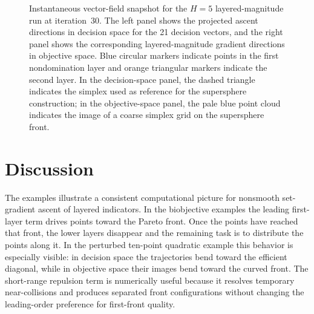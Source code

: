 \documentclass{article}
\begin{document}
\begin{figure}[htbp]




















































\caption{Instantaneous vector-field snapshot for the $H=5$ layered-magnitude run at iteration~30. The left panel shows the projected ascent directions in decision space for the 21 decision vectors, and the right panel shows the corresponding layered-magnitude gradient directions in objective space. Blue circular markers indicate points in the first nondomination layer and orange triangular markers indicate the second layer. In the decision-space panel, the dashed triangle indicates the simplex used as reference for the supersphere construction; in the objective-space panel, the pale blue point cloud indicates the image of a coarse simplex grid on the supersphere front.}
\label{fig:h5-iter30-magnitude-vectorfield}
\end{figure}

\section{Discussion}
The examples illustrate a consistent computational picture for nonsmooth set-gradient ascent of layered indicators.  In the biobjective examples the leading first-layer term drives points toward the Pareto front.  Once the points have reached that front, the lower layers disappear and the remaining task is to distribute the points along it.  In the perturbed ten-point quadratic example this behavior is especially visible: in decision space the trajectories bend toward the efficient diagonal, while in objective space their images bend toward the curved front.  The short-range repulsion term is numerically useful because it resolves temporary near-collisions and produces separated front configurations without changing the leading-order preference for first-front quality.
\end{document}
